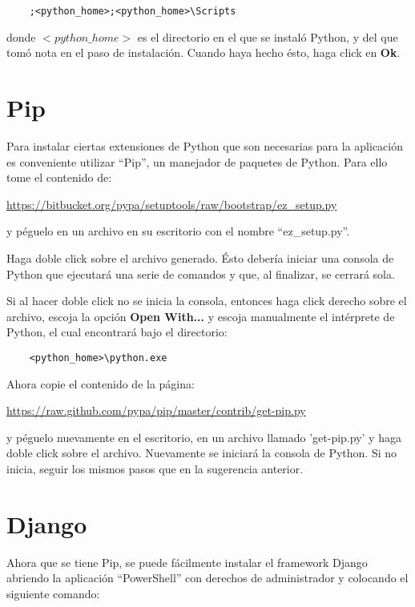 \documentclass[9pt, letterpaper, oneside]{report}
\begin{document}
    \begin{verbatim}
    ;<python_home>;<python_home>\Scripts
    \end{verbatim}

    donde $<python\_home>$ es el directorio en el que se instaló Python, y del que
    tomó nota en el paso de instalación. Cuando haya hecho ésto, haga click en
    \textbf{Ok}.

  \section{Pip}
    Para instalar ciertas extensiones de Python que son necesarias para la aplicación
    es conveniente utilizar ``Pip'', un manejador de paquetes de Python. Para ello tome
    el contenido de:

    \vspace{3mm}
    \url{https://bitbucket.org/pypa/setuptools/raw/bootstrap/ez\_setup.py}
    \vspace{3mm}
      
    y péguelo en un archivo en su escritorio con el nombre ``ez\_setup.py''.

    Haga doble click sobre el archivo generado. Ésto debería iniciar una consola de 
    Python que ejecutará una serie de comandos y que, al finalizar, se cerrará sola.

    Si al hacer doble click no se inicia la consola, entonces haga click derecho
    sobre el archivo, escoja la opción \textbf{Open With...} y escoja manualmente el
    intérprete de Python, el cual encontrará bajo el directorio:

    \begin{verbatim}
    <python_home>\python.exe
    \end{verbatim}

    Ahora copie el contenido de la página:

    \vspace{3mm}
    \url{https://raw.github.com/pypa/pip/master/contrib/get-pip.py}
    \vspace{3mm}
      
    y péguelo nuevamente en el escritorio, en un archivo llamado 'get-pip.py' y haga
    doble click sobre el archivo. Nuevamente se iniciará la consola de Python. Si no
    inicia, seguir los mismos pasos que en la sugerencia anterior.

  \section{Django}
    Ahora que se tiene Pip, se puede fácilmente instalar el framework Django 
    abriendo la aplicación ``PowerShell'' con derechos de administrador y colocando el
    siguiente comando:
\end{document}
